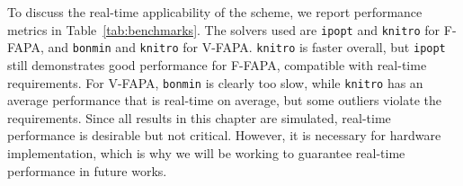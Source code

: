 To discuss the real-time applicability of the scheme, we report performance
metrics in Table~\ref{tab:benchmarks}. The solvers used are \texttt{ipopt}
and \texttt{knitro} for F-FAPA, and \texttt{bonmin} and \texttt{knitro} for
V-FAPA. \texttt{knitro} is faster overall, but \texttt{ipopt} still
demonstrates good performance for F-FAPA, compatible with real-time
requirements. For V-FAPA, \texttt{bonmin} is clearly too slow, while
\texttt{knitro} has an average performance that is real-time on average,
but some outliers violate the requirements. Since all results in this chapter
are simulated, real-time performance is desirable but not critical.
However, it is necessary for hardware implementation, which is why we will
be working to guarantee real-time performance in future works.
